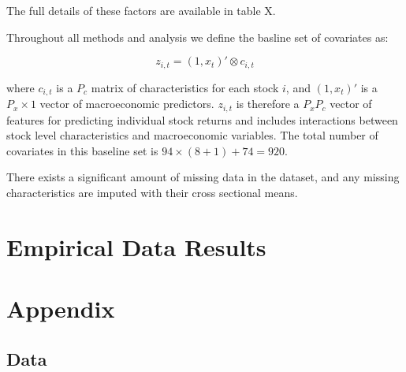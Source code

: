\documentclass[a4paper, table]{article}
\begin{document}
The full details of these factors are available in table X.

Throughout all methods and analysis we define the basline set of covariates as:

\begin{equation}
z_{i,t} = (1, x_t)' \otimes c_{i, t}
\end{equation}

where $c_{i,t}$ is a $P_c$ matrix of characteristics for each stock $i$, and $(1, x_t)'$ is a $P_x \times 1$ vector of macroeconomic predictors. $z_{i,t}$ is therefore a $P_x P_c$ vector of features for predicting individual stock returns and includes interactions between stock level characteristics and macroeconomic variables. The total number of covariates in this baseline set is $94 \times (8 + 1) + 74 = 920$.

There exists a significant amount of missing data in the dataset, and any missing characteristics are imputed with their cross sectional means. 

\section{Empirical Data Results}

\section{Appendix}

\subsection{Data}
\end{document}
